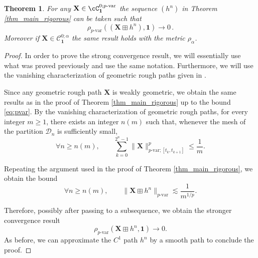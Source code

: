 \documentclass[12pt,a4paper]{article}
\numberwithin{equation}{section}
\def\fX{\mathbf{X}}
\theoremstyle{plain}
\newtheorem{theorem}{Theorem}[section]
\theoremstyle{definition}
\theoremstyle{remark}
\begin{document}
\begin{theorem}\label{thm_main_rigorous_geo}
	For any  $\fX\in \cC^{0;p\text{-var}}_{\mathbf{1}}$  the sequence $(h^n)$ in Theorem \ref{thm_main_rigorous} can be taken such that \begin{equation}\label{eq:strong_conv}
\rho_{p\text{-var}}((\mathbf X\boxplus h^n),\mathbf 1)\to 0\,.
	\end{equation}
	Moreover if $\mathbf{X} \in \mathcal{C}^{0;\alpha}_{\mathbf{1}}$ the same result holds with the metric $\rho_{\alpha} $.
\end{theorem}
\begin{proof}
In order to prove the strong convergence result, we will essentially use what was proved previously and use the same notation. Furthermore, we will use the vanishing characterization of geometric rough paths given in \cite[Theorem 8.22]{frizbook}.

Since any geometric rough path $\fX$ is weakly geometric, we obtain the same results as in the proof of Theorem \ref{thm_main_rigorous} up to the bound \eqref{eq:pvar}.  By the vanishing characterization of geometric rough paths, for every integer $m \geq 1$, there exists an integer $n(m)$ such that, whenever the mesh of the partition $\mathcal D_n$ is sufficiently small,
\[
\forall n\geq n(m), \qquad
\sum_{k=0}^{2^n-1}
\|\mathbf X\|_{p\text{-var};[t_k,t_{k+1}]}^p
\leq \frac{1}{m}.
\]

Repeating the argument used in the proof of Theorem \ref{thm_main_rigorous}, we obtain the bound
\[
\forall n \geq n(m), \qquad
\|\fX\boxplus h^n \|_{p\text{-var}}
\lesssim \frac{1}{m^{1/p}}.
\]

Therefore, possibly after passing to a subsequence, we obtain the stronger convergence result
\[
\rho_{p\text{-var}}(\fX\boxplus h^n, \mathbf 1)
\to 0.
\]
As before, we can approximate the $C^1$ path $h^n$ by a smooth path to conclude the proof.
\end{proof}
\end{document}
